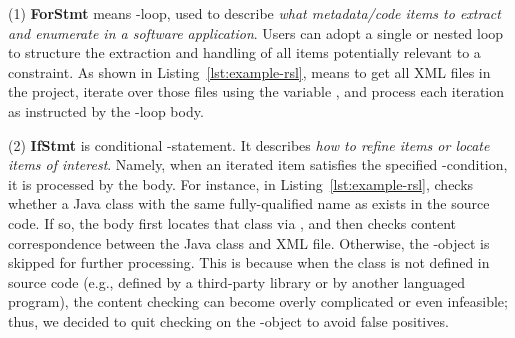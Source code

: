 (1) \textbf{ForStmt} means -loop, used to describe \emph{what metadata/code items to extract and enumerate in a software application}. 
 Users can adopt a single or nested loop to structure the extraction and handling of all items potentially relevant to a constraint.  As shown in  Listing~\ref{lst:example-rsl},  means to get all XML files in the project, iterate over those files using the variable , and process each iteration as instructed by the -loop body. 

 (2) \textbf{IfStmt} is conditional -statement. It describes \emph{how to refine items or locate items of interest}. Namely, when an iterated item satisfies the specified -condition, it is processed by the body. %
For instance, 
in Listing~\ref{lst:example-rsl},  checks whether a Java class with the same fully-qualified name as  exists in the source code. If so, 
the body first locates that class via , and then
checks content correspondence between the Java class and XML file. Otherwise, the -object is skipped for further processing.  
This is because when the class is not defined in source code 
 (e.g., defined by a third-party library or by another languaged program), the content checking can become overly complicated or even infeasible; thus,  
 we decided to quit checking on the 
 -object to avoid false positives.

